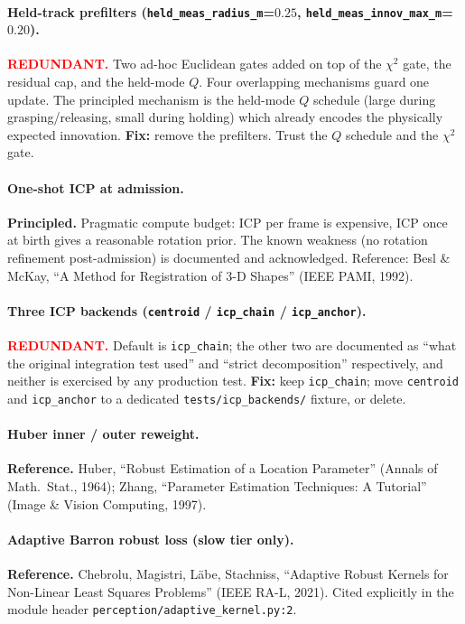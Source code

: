 \documentclass[11pt]{article}
\newcommand{\REDUNDANT}{\textcolor{red}{\textbf{REDUNDANT.}}}
\newcommand{\REFERENCE}{\textbf{Reference.}}
\newcommand{\PRINCIPLED}{\textbf{Principled.}}
\begin{document}
\paragraph{Held-track prefilters (\texttt{held\_meas\_radius\_m}=$0.25$,
\texttt{held\_meas\_innov\_max\_m}=$0.20$).}
\REDUNDANT{} Two ad-hoc Euclidean gates added on top of the $\chi^2$
gate, the residual cap, and the held-mode $Q$. Four overlapping
mechanisms guard one update. The principled mechanism is the
held-mode $Q$ schedule (large during grasping/releasing, small during
holding) which already encodes the physically expected innovation.
\textbf{Fix:} remove the prefilters. Trust the $Q$ schedule and the
$\chi^2$ gate.

\paragraph{One-shot ICP at admission.}
\PRINCIPLED{} Pragmatic compute budget: ICP per frame is expensive,
ICP once at birth gives a reasonable rotation prior. The known
weakness (no rotation refinement post-admission) is documented and
acknowledged. Reference: Besl \& McKay, ``A Method for Registration
of 3-D Shapes'' (IEEE PAMI, 1992).

\paragraph{Three ICP backends (\texttt{centroid} / \texttt{icp\_chain}
/ \texttt{icp\_anchor}).}
\REDUNDANT{} Default is \texttt{icp\_chain}; the other two are
documented as ``what the original integration test used'' and ``strict
decomposition'' respectively, and neither is exercised by any
production test.
\textbf{Fix:} keep \texttt{icp\_chain}; move \texttt{centroid} and
\texttt{icp\_anchor} to a dedicated \texttt{tests/icp\_backends/}
fixture, or delete.

\paragraph{Huber inner / outer reweight.}
\REFERENCE{} Huber, ``Robust Estimation of a Location Parameter''
(Annals of Math.~Stat., 1964); Zhang, ``Parameter Estimation
Techniques: A Tutorial'' (Image \& Vision Computing, 1997).

\paragraph{Adaptive Barron robust loss (slow tier only).}
\REFERENCE{} Chebrolu, Magistri, L\"abe, Stachniss, ``Adaptive Robust
Kernels for Non-Linear Least Squares Problems'' (IEEE RA-L, 2021).
Cited explicitly in the module header
\texttt{perception/adaptive\_kernel.py:2}.
\end{document}
